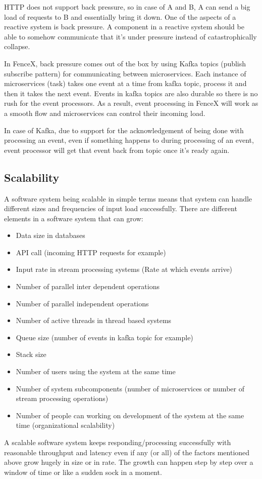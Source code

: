 \documentclass[a4]{report}
\begin{document}
        HTTP does not support back pressure, so in case of A and B, A can send a big load of requests to B and
        essentially bring it down.
        One of the aspects of a reactive system is back pressure.
        A component in a reactive system should be able to somehow communicate that it's under pressure instead of
        catastrophically collapse.

        In FenceX, back pressure comes out of the box by using Kafka topics (publish subscribe pattern) for communicating
        between microservices.
        Each instance of microservices (task) takes one event at a time from kafka topic, process it and then it takes
        the next event.
        Events in kafka topics are also durable so there is no rush for the event processors.
        As a result, event processing in FenceX will work as a smooth flow and microservices can control their incoming load.

        In case of Kafka, due to support for the acknowledgement of being done with processing an event, even if
        something happens to during processing of an event, event processor will get that event back from topic once it's
        ready again.

        \subsection{Scalability}
        A software system being scalable in simple terms means that system can handle different sizes and frequencies of
        input load successfully.
        There are different elements in a software system that can grow:
        \begin{itemize}
            \item Data size in databases
            \item API call (incoming HTTP requests for example)
            \item Input rate in stream processing systems (Rate at which events arrive)
            \item Number of parallel inter dependent operations
            \item Number of parallel independent operations
            \item Number of active threads in thread based systems
            \item Queue size (number of events in kafka topic for example)
            \item Stack size
            \item Number of users using the system at the same time
            \item Number of system subcomponents (number of microservices or number of stream processing operations)
            \item Number of people can working on development of the system at the same time (organizational scalability)
        \end{itemize}
        A scalable software system keeps responding/processing successfully with reasonable throughput and latency even if
        any (or all) of the factors mentioned above grow hugely in size or in rate.
        The growth can happen step by step over a window of time or like a sudden sock in a moment.
\end{document}
